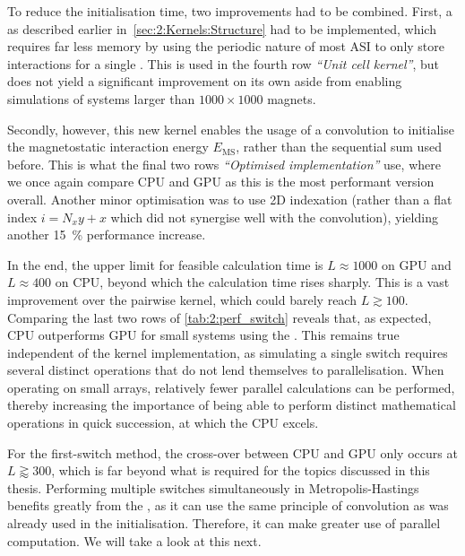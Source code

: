 To reduce the initialisation time, two improvements had to be combined.
First, a  as described earlier in~\cref{sec:2:Kernels:Structure} had to be implemented, which requires far less memory by using the periodic nature of most ASI to only store interactions for a single .
This is used in the fourth row \textit{``Unit cell kernel''}, but does not yield a significant improvement on its own aside from enabling simulations of systems larger than $1000 \times 1000$ magnets. \par
Secondly, however, this new kernel enables the usage of a convolution to initialise the magnetostatic interaction energy $E_\mathrm{MS}$, rather than the sequential sum used before.
This is what the final two rows \textit{``Optimised implementation''} use, where we once again compare CPU and GPU as this is the most performant version overall.
Another minor optimisation was to use 2D indexation (rather than a flat index $i = N_x y + x$ which did not synergise well with the convolution), yielding another \SI{15}{\percent} performance increase. \\\par

In the end, the upper limit for feasible calculation time is $L \approx 1000$ on GPU and $L \approx 400$ on CPU, beyond which the calculation time rises sharply.
This is a vast improvement over the pairwise kernel, which could barely reach $L \gtrsim 100$.
Comparing the last two rows of \cref{tab:2:perf_switch} reveals that, as expected, CPU outperforms GPU for small systems using the .
This remains true independent of the kernel implementation, as simulating a single switch requires several distinct operations that do not lend themselves to parallelisation.
When operating on small arrays, relatively fewer parallel calculations can be performed, thereby increasing the importance of being able to perform distinct mathematical operations in quick succession, at which the CPU excels. \par
For the first-switch method, the cross-over between CPU and GPU only occurs at $L \gtrapprox 300$, which is far beyond what is required for the topics discussed in this thesis.
Performing multiple switches simultaneously in Metropolis-Hastings benefits greatly from the , as it can use the same principle of convolution as was already used in the initialisation.
Therefore, it can make greater use of parallel computation.
We will take a look at this next.


